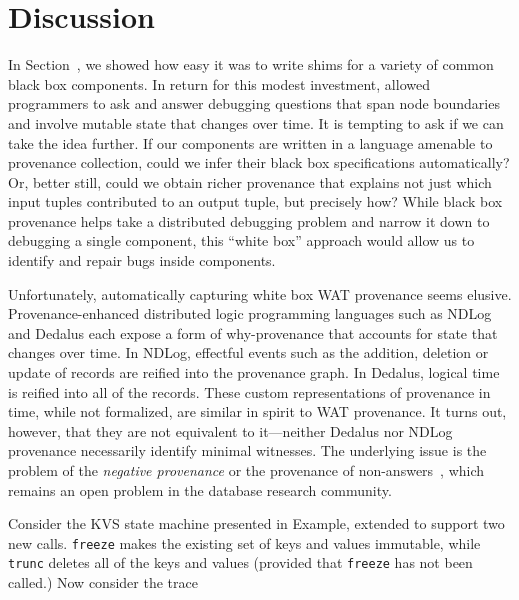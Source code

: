\section{Discussion}

In Section~, we showed how easy it was to write shims
for a variety of common black box components.  In return for this modest
investment, \fluent{}  allowed programmers to ask and answer debugging questions
that span node boundaries and involve mutable state that changes over time.
It is tempting to ask if we can take the idea further.  If our components are
written in a language amenable to provenance collection, could we infer their
black box specifications automatically?  Or, better still, could we obtain
richer provenance that explains not just which input tuples contributed to
an output tuple, but precisely how?  While black box provenance helps take
a distributed debugging problem and narrow it down to debugging a single
component, this ``white box'' approach would allow us to identify and repair
bugs inside components.

Unfortunately, automatically capturing white box WAT provenance seems elusive.
Provenance-enhanced distributed logic programming languages such as NDLog and
Dedalus each expose a form of why-provenance that accounts for state that
changes over time.  In NDLog, effectful events such as the addition, deletion or update of records are reified into the provenance graph.  In Dedalus, logical
time is reified into all of the records.  These custom representations of
provenance in time, while not formalized, are similar in spirit to WAT provenance.
It turns out, however, that they are not equivalent to it---neither Dedalus nor
NDLog provenance necessarily identify minimal witnesses.  The underlying issue
is the problem of the \emph{negative provenance} or the provenance of
non-answers~\cite{chapman2009whynot,huang2008nonanswers}, which remains an open problem in
the database research community.

\newcommand{\kvset}{\text{set}}
\newcommand{\kvget}{\text{get}}
\newcommand{\freeze}{\text{freeze}}
\newcommand{\trunc}{\text{trunc}}

Consider the KVS state machine presented in Example, extended to support two new calls.   \texttt{freeze} makes the existing set of keys and values immutable, while \texttt{trunc} deletes all of the keys and values (provided that \texttt{freeze} has not been called.)  Now consider the trace

